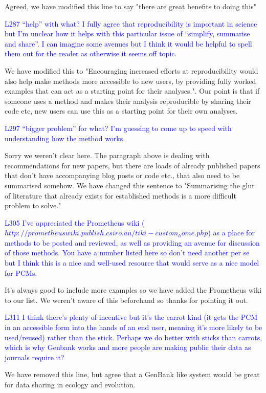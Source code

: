 \documentclass[12pt]{letter}
\begin{document}
\begin{letter}{}
Agreed, we have modified this line to say "there are great benefits to doing this"

\textcolor{blue}{L287 “help” with what? I fully agree that reproducibility is important in science but I'm unclear how it helps with this particular issue of “simplify, summarise and share”. I can imagine some avenues but I think it would be helpful to spell them out for the reader as otherwise it seems off topic.}

We have modified this to "Encouraging increased efforts at reproducibility would also help make methods more accessible to new users, by providing fully worked examples that can act as a starting point for their analyses.". Our point is that if someone uses a method and makes their analysis reproducible by sharing their code etc, new users can use this as a starting point for their own analyses. 

\textcolor{blue}{L297 “bigger problem” for what? I'm guessing to come up to speed with understanding how the method works.}

Sorry we weren't clear here. The paragraph above is dealing with recommendations for new papers, but there are loads of already published papers that don't have accompanying blog posts or code etc., that also need to be summarised somehow. We have changed this sentence to "Summarising the glut of literature that already exists for established methods is a more difficult problem to solve."

\textcolor{blue}{L305 I've appreciated the Prometheus wiki ($http://prometheuswiki.publish.csiro.au/tiki-custom_home.php$) as a place for methods to be posted and reviewed, as well as providing an avenue for discussion of those methods. You have a number listed here so don't need another per se but I think this is a nice and well-used resource that would serve as a nice model for PCMs.}

It's always good to include more examples so we have added the Prometheus wiki to our list. We weren't aware of this beforehand so thanks for pointing it out.

\textcolor{blue}{L311 I think there's plenty of incentive but it's the carrot kind (it gets the PCM in an accessible form into the hands of an end user, meaning it's more likely to be used/reused) rather than the stick. Perhaps we do better with sticks than carrots, which is why Genbank works and more people are making public their data as journals require it?}

We have removed this line, but agree that a GenBank like system would be great for data sharing in ecology and evolution.


\end{letter}
\end{document}
